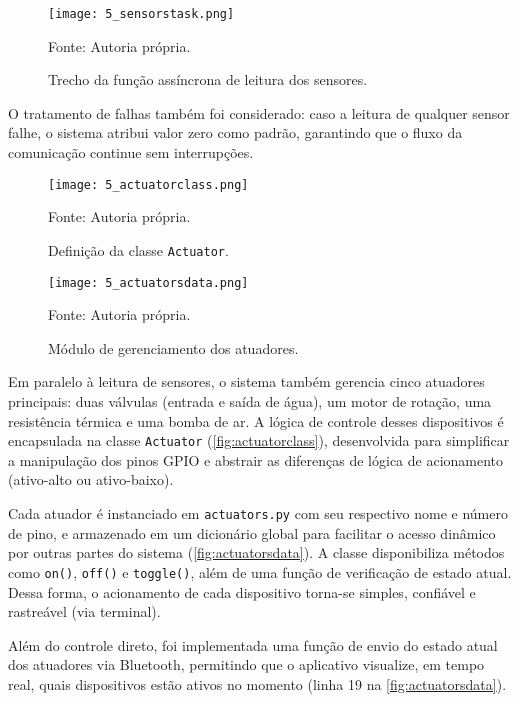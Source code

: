 \begin{figure}[ht]
    \centering
    \caption{Trecho da função assíncrona de leitura dos sensores.}
    \label{fig:sensorstask}
    \texttt{[image: 5\_sensorstask.png]}

    {\centering\footnotesize Fonte: Autoria própria.\par}
\end{figure}

O tratamento de falhas também foi considerado: caso a leitura de qualquer sensor falhe, o sistema atribui valor zero como padrão, garantindo que o fluxo da comunicação continue sem interrupções.

\begin{figure}[ht]
    \centering
    \caption{Definição da classe \texttt{Actuator}.}
    \label{fig:actuatorclass}
    \texttt{[image: 5\_actuatorclass.png]}

    {\centering\footnotesize Fonte: Autoria própria.\par}
\end{figure}

\begin{figure}[ht]
    \centering
    \caption{Módulo de gerenciamento dos atuadores.}
    \label{fig:actuatorsdata}
    \texttt{[image: 5\_actuatorsdata.png]}

    {\centering\footnotesize Fonte: Autoria própria.\par}
\end{figure}

Em paralelo à leitura de sensores, o sistema também gerencia cinco atuadores principais: duas válvulas (entrada e saída de água), um motor de rotação, uma resistência térmica e uma bomba de ar. A lógica de controle desses dispositivos é encapsulada na classe \texttt{Actuator} (\autoref{fig:actuatorclass}), desenvolvida para simplificar a manipulação dos pinos GPIO e abstrair as diferenças de lógica de acionamento (ativo-alto ou ativo-baixo).

Cada atuador é instanciado em \texttt{actuators.py} com seu respectivo nome e número de pino, e armazenado em um dicionário global para facilitar o acesso dinâmico por outras partes do sistema (\autoref{fig:actuatorsdata}). A classe disponibiliza métodos como \texttt{on()}, \texttt{off()} e \texttt{toggle()}, além de uma função de verificação de estado atual. Dessa forma, o acionamento de cada dispositivo torna-se simples, confiável e rastreável (via terminal).

Além do controle direto, foi implementada uma função de envio do estado atual dos atuadores via Bluetooth, permitindo que o aplicativo visualize, em tempo real, quais dispositivos estão ativos no momento (linha 19 na \autoref{fig:actuatorsdata}).

